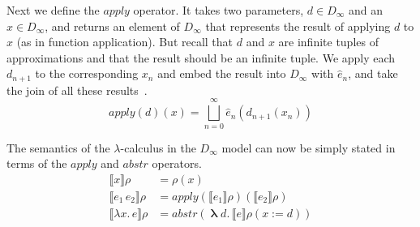 \documentclass{tufte-handout}
\newcommand{\SEM}[1]{\llbracket #1 \rrbracket}
\newcommand{\LAM}[1]{\lambda #1.\,}
\newcommand{\MLAM}[1]{\boldsymbol\uplambda #1.\,}
\newcommand{\APP}[0]{\,}
\newcommand{\by}[0]{\!:=\!}
\begin{document}
Next we define the $\mathit{apply}$ operator. It takes two parameters,
$d \in D_\infty$ and an $x\in D_\infty$, and returns an element of
$D_\infty$ that represents the result of applying $d$ to $x$ (as in
function application). But recall that $d$ and $x$ are infinite tuples
of approximations and that the result should be an infinite tuple.
We apply each $d_{n+1}$ to the corresponding $x_n$ and embed the
result into $D_\infty$ with $\hat{e}_n$, and take the join of all
these results~\citep{Scott:1971aa,barendregt84:_lambda_calculus}.
\[
   \mathit{apply}(d)(x) =  \bigsqcup_{n=0}^{\infty} \hat{e}_n(d_{n+1}(x_n))
\]

The semantics of the $\lambda$-calculus in the $D_\infty$ model can
now be simply stated in terms of the $\mathit{apply}$ and
$\mathit{abstr}$ operators.
\begin{align*}
  \SEM{x}\rho &= \rho(x) \\
  \SEM{e_1 \APP e_2}\rho &= \mathit{apply}(\SEM{e_1}\rho)(\SEM{e_2}\rho) \\
  \SEM{\LAM{x} e}\rho &= \mathit{abstr}(\MLAM{d} \SEM{e}\rho(x\by d))
\end{align*}
\end{document}
